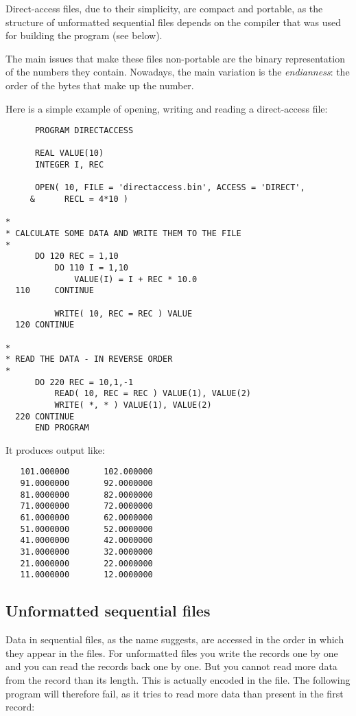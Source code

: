 Direct-access files, due to their simplicity, are compact and portable, as the structure of
unformatted sequential files depends on the compiler that was used for building the program (see below).

The main issues that make these files non-portable are the binary representation of the
numbers they contain. Nowadays, the main variation is the \emph{endianness}: the order of the
bytes that make up the number.

Here is a simple example of opening, writing and reading a direct-access file:

\begin{verbatim}
      PROGRAM DIRECTACCESS

      REAL VALUE(10)
      INTEGER I, REC

      OPEN( 10, FILE = 'directaccess.bin', ACCESS = 'DIRECT',
     &      RECL = 4*10 )

*
* CALCULATE SOME DATA AND WRITE THEM TO THE FILE
*
      DO 120 REC = 1,10
          DO 110 I = 1,10
              VALUE(I) = I + REC * 10.0
  110     CONTINUE

          WRITE( 10, REC = REC ) VALUE
  120 CONTINUE

*
* READ THE DATA - IN REVERSE ORDER
*
      DO 220 REC = 10,1,-1
          READ( 10, REC = REC ) VALUE(1), VALUE(2)
          WRITE( *, * ) VALUE(1), VALUE(2)
  220 CONTINUE
      END PROGRAM
\end{verbatim}

It produces output like:
\begin{verbatim}
   101.000000       102.000000
   91.0000000       92.0000000
   81.0000000       82.0000000
   71.0000000       72.0000000
   61.0000000       62.0000000
   51.0000000       52.0000000
   41.0000000       42.0000000
   31.0000000       32.0000000
   21.0000000       22.0000000
   11.0000000       12.0000000
\end{verbatim}


\subsection{Unformatted sequential files}
Data in sequential files, as the name suggests, are accessed in the order in which they appear in the files.
For unformatted files you write the records one by one and you can read the records back one by one.
But you cannot read more data from the record than its length. This is actually encoded in the file.
The following program will therefore fail, as it tries to read more data than present in the first
record:

